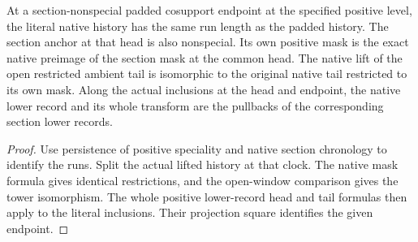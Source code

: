 \begin{theorem}
\label{hir:g1-positive-normal-aligned-native-tail}
\leanok
At a section-nonspecial padded cosupport endpoint at the
specified positive level, the literal native history has the
same run length as the padded history. The section anchor at
that head is also nonspecial. Its own positive
mask is the exact native preimage of the section mask at the
common head. The native lift of the open restricted ambient
tail is isomorphic to the original native tail restricted to
its own mask. Along the actual inclusions at the head and
endpoint, the native lower record and its whole transform are
the pullbacks of the corresponding section lower records.
\end{theorem}
\begin{proof}
Use persistence of positive speciality and native section
chronology to identify the runs. Split the actual lifted history
at that clock. The native
mask formula gives identical restrictions, and the open-window
comparison gives the tower isomorphism. The whole positive
lower-record head and tail formulas then apply to the literal
inclusions. Their projection square identifies the given endpoint.
\end{proof}

